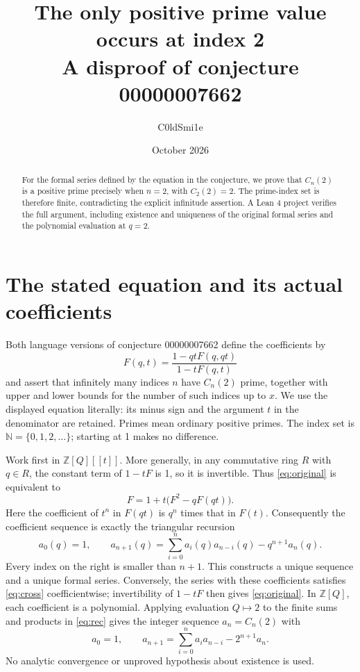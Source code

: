 \documentclass[11pt]{article}
\title{The only positive prime value occurs at index 2\\[3pt]
\large A disproof of conjecture 00000007662}
\author{C0ldSmi1e}
\date{October 2026}
\newcommand{\Z}{\mathbb Z}
\newcommand{\N}{\mathbb N}
\begin{document}
\maketitle
\begin{abstract}
For the formal series defined by the equation in the conjecture, we prove
that $C_n(2)$ is a positive prime precisely when $n=2$, with $C_2(2)=2$.
The prime-index set is therefore finite, contradicting the explicit
infinitude assertion. A Lean 4 project verifies the full argument,
including existence and uniqueness of the original formal series and
the polynomial evaluation at $q=2$.
\end{abstract}

\section{The stated equation and its actual coefficients}
Both language versions of conjecture 00000007662 define the coefficients by
\begin{equation}\label{eq:original}
 F(q,t)=\frac{1-qtF(q,qt)}{1-tF(q,t)}
\end{equation}
and assert that infinitely many indices $n$ have $C_n(2)$ prime, together
with upper and lower bounds for the number of such indices up to $x$.
We use the displayed equation literally: its minus sign and the argument
$t$ in the denominator are retained. Primes mean ordinary positive primes.
The index set is $\N=\{0,1,2,\ldots\}$; starting at 1 makes no difference.

Work first in $\Z[Q][[t]]$. More generally, in any commutative ring $R$
with $q\in R$, the constant term of $1-tF$ is 1, so it is invertible.
Thus \eqref{eq:original} is equivalent to
\begin{equation}\label{eq:cross}
 F=1+t\bigl(F^2-qF(qt)\bigr).
\end{equation}
Here the coefficient of $t^n$ in $F(qt)$ is $q^n$ times that in $F(t)$.
Consequently the coefficient sequence is exactly the triangular recursion
\begin{equation}\label{eq:rec}
 a_0(q)=1,\qquad
 a_{n+1}(q)=\sum_{i=0}^{n}a_i(q)a_{n-i}(q)-q^{n+1}a_n(q).
\end{equation}
Every index on the right is smaller than $n+1$. This constructs a unique
sequence and a unique formal series. Conversely, the series with these
coefficients satisfies \eqref{eq:cross} coefficientwise; invertibility of
$1-tF$ then gives \eqref{eq:original}. In $\Z[Q]$, each coefficient is a
polynomial. Applying evaluation $Q\mapsto2$ to the finite sums and products
in \eqref{eq:rec} gives the integer sequence $a_n=C_n(2)$ with
\[
 a_0=1,\qquad a_{n+1}=\sum_{i=0}^{n}a_i a_{n-i}-2^{n+1}a_n.
\]
No analytic convergence or unproved hypothesis about existence is used.
\end{document}
